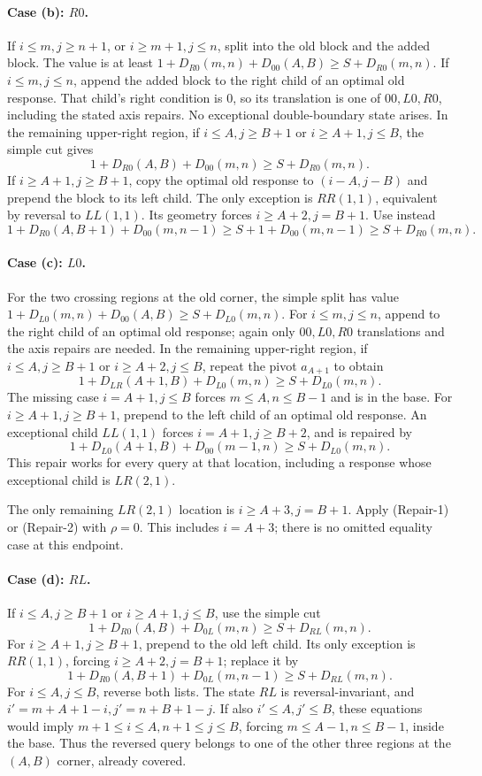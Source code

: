 \documentclass[11pt]{article}
\theoremstyle{definition}
\theoremstyle{remark}
\begin{document}
\paragraph{Case (b): $R0$.}
If $i\le m,j\ge n+1$, or $i\ge m+1,j\le n$, split into the old block and
the added block. The value is at least
$1+D_{R0}(m,n)+D_{00}(A,B)\ge S+D_{R0}(m,n)$.
If $i\le m,j\le n$, append the added block to the right child of an optimal
old response. That child's right condition is $0$, so its translation is
one of $00,L0,R0$, including the stated axis repairs. No exceptional
double-boundary state arises. In the remaining upper-right region,
if $i\le A,j\ge B+1$ or $i\ge A+1,j\le B$, the simple cut gives
\[
 1+D_{R0}(A,B)+D_{00}(m,n)\ge S+D_{R0}(m,n).
\]
If $i\ge A+1,j\ge B+1$, copy the optimal old response to
$(i-A,j-B)$ and prepend the block to its left child. The only exception is
$RR(1,1)$, equivalent by reversal to $LL(1,1)$. Its geometry forces
$i\ge A+2,j=B+1$. Use instead
\[
 1+D_{R0}(A,B+1)+D_{00}(m,n-1)
 \ge S+1+D_{00}(m,n-1)\ge S+D_{R0}(m,n).
\]

\paragraph{Case (c): $L0$.}
For the two crossing regions at the old corner, the simple split has value
$1+D_{L0}(m,n)+D_{00}(A,B)\ge S+D_{L0}(m,n)$.
For $i\le m,j\le n$, append to the right child of an optimal old response;
again only $00,L0,R0$ translations and the axis repairs are needed.
In the remaining upper-right region, if $i\le A,j\ge B+1$ or
$i\ge A+2,j\le B$, repeat the pivot
$a_{A+1}$ to obtain
\[
 1+D_{LR}(A+1,B)+D_{L0}(m,n)\ge S+D_{L0}(m,n).
\]
The missing case $i=A+1,j\le B$ forces $m\le A,n\le B-1$ and is in the base.
For $i\ge A+1,j\ge B+1$, prepend to the left child of an optimal old response.
An exceptional child $LL(1,1)$ forces $i=A+1,j\ge B+2$, and is repaired by
\[
 1+D_{L0}(A+1,B)+D_{00}(m-1,n)\ge S+D_{L0}(m,n).
\]
This repair works for every query at that location, including a response
whose exceptional child is $LR(2,1)$.

The only remaining $LR(2,1)$ location is $i\ge A+3,j=B+1$.
Apply (Repair-1) or (Repair-2) with $\rho=0$. This includes $i=A+3$;
there is no omitted equality case at this endpoint.

\paragraph{Case (d): $RL$.}
If $i\le A,j\ge B+1$ or $i\ge A+1,j\le B$, use the simple cut
\[
 1+D_{R0}(A,B)+D_{0L}(m,n)\ge S+D_{RL}(m,n).
\]
For $i\ge A+1,j\ge B+1$, prepend to the old left child. Its only exception is
$RR(1,1)$, forcing $i\ge A+2,j=B+1$; replace it by
\[
 1+D_{R0}(A,B+1)+D_{0L}(m,n-1)\ge S+D_{RL}(m,n).
\]
For $i\le A,j\le B$, reverse both lists. The state $RL$ is reversal-invariant,
and $i'=m+A+1-i,j'=n+B+1-j$. If also $i'\le A,j'\le B$, these equations
would imply $m+1\le i\le A,n+1\le j\le B$, forcing
$m\le A-1,n\le B-1$, inside the base. Thus the reversed query belongs
to one of the other three regions at the $(A,B)$ corner, already covered.
\end{document}
